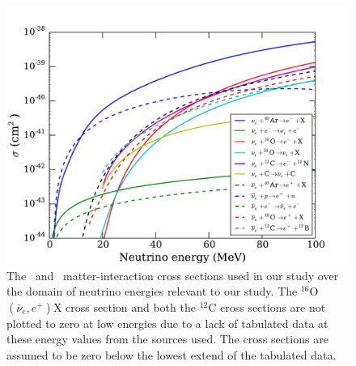 \begin{figure}[h]
\includegraphics[width=4.5in]{all_neutrino_sigma_for_paper.pdf}
\centering
\caption{\label{fig:sigma}The \nue\ and \anue\ matter-interaction 
cross sections used in  our study over the domain of neutrino 
energies relevant to our study.  The $^{16}$O$(\bar\nu_e,e^+)$X
cross section and both the $^{12}$C cross sections are not plotted to
zero at low energies due to a lack of tabulated data at these energy
values from the sources used.  The cross sections are assumed to be
zero below the lowest extend of the tabulated data.}
\end{figure}
